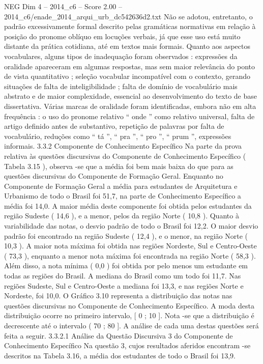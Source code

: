 \begin{textsample}{NEG Dim 4 – 2014\_c6 – Score 2.00 – 2014\_c6/enade\_2014\_arqui\_urb\_dc542636d2.txt}
Não se adotou, entretanto, o padrão excessivamente formal descrito pelas gramáticas normativas em relação à posição do pronome oblíquo em locuções verbais, já que esse uso está muito distante da prática cotidiana, até em textos mais formais.
Quanto aos aspectos vocabulares, alguns tipos de inadequação foram observados : expressões da oralidade apareceram em algumas respostas, mas sem maior relevância do ponto de vista quantitativo ; seleção vocabular incompatível com o contexto, gerando situações de falta de inteligibilidade ; falta de domínio de vocabulário mais abstrato e de maior complexidade, essencial ao desenvolvimento do texto de base dissertativa.
Várias marcas de oralidade foram identificadas, embora não em alta frequência : o uso do pronome relativo “ onde ” como relativo universal, falta de artigo definido antes de substantivo, repetição de palavras por falta de vocabulário, reduções como “ tá ”, “ pra ”, “ pro ”, “ prum ”, expressões informais. 3.3.2 Componente de Conhecimento Específico Na parte da prova relativa às questões discursivas do Componente de Conhecimento Específico ( Tabela 3.15 ), observa -se que a média foi bem mais baixa do que para as questões discursivas do Componente de Formação Geral.
Enquanto no Componente de Formação Geral a média para estudantes de Arquitetura e Urbanismo de todo o Brasil foi 51,7, na parte de Conhecimento Específico a média foi 14,0.
A maior média deste componente foi obtida pelos estudantes da região Sudeste ( 14,6 ), e a menor, pelos da região Norte ( 10,8 ).
Quanto à variabilidade das notas, o desvio padrão de todo o Brasil foi 12,2.
O maior desvio padrão foi encontrado na região Sudeste ( 12,4 ), e o menor, na região Norte ( 10,3 ).
A maior nota máxima foi obtida nas regiões Nordeste, Sul e Centro-Oeste ( 73,3 ), enquanto a menor nota máxima foi encontrada na região Norte ( 58,3 ).
Além disso, a nota mínima ( 0,0 ) foi obtida por pelo menos um estudante em todas as regiões do Brasil.
A mediana do Brasil como um todo foi 11,7.
Nas regiões Sudeste, Sul e Centro-Oeste a mediana foi 13,3, e nas regiões Norte e Nordeste, foi 10,0.
O Gráfico 3.10 representa a distribuição das notas nas questões discursivas no Componente de Conhecimento Específico.
A moda desta distribuição ocorre no primeiro intervalo, [ 0 ; 10 ].
Nota -se que a distribuição é decrescente até o intervalo ( 70 ; 80 ].
A análise de cada uma destas questões será feita a seguir. 3.3.2.1 Análise da Questão Discursiva 3 do Componente de Conhecimento Específico Na questão 3, cujos resultados aferidos encontram -se descritos na Tabela 3.16, a média dos estudantes de todo o Brasil foi 13,9.

\end{textsample}
